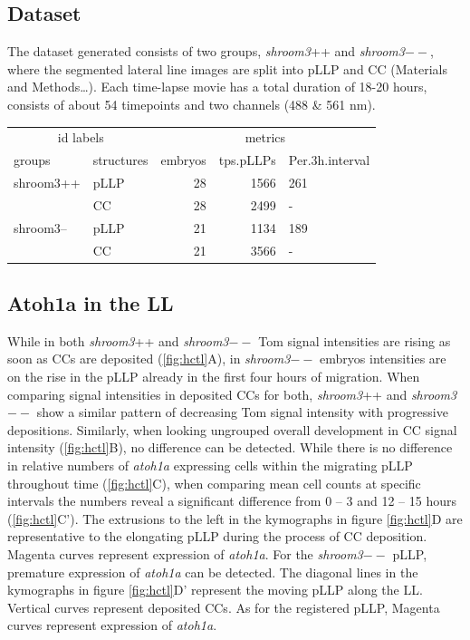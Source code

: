 \documentclass[11pt,singlespacinge,twoside]{reedthesis} %
\begin{document}
\hypertarget{dataset-4}{%
\subsection{Dataset}\label{dataset-4}}

The dataset generated consists of two groups, \emph{shroom3}++ and \emph{shroom3}\(--\), where the segmented lateral line images are split into pLLP and CC (Materials and Methods\ldots{}). Each time-lapse movie has a total duration of 18-20 hours, consists of about 54 timepoints and two channels (488 \& 561 nm).
\begin{tabular}{llrrl}
\toprule
\multicolumn{2}{c}{id labels} & \multicolumn{3}{c}{metrics} \\
\cmidrule(l{3pt}r{3pt}){1-2} \cmidrule(l{3pt}r{3pt}){3-5}
groups & structures & embryos & tps.pLLPs & Per.3h.interval\\
\midrule
shroom3++ & pLLP & 28 & 1566 & 261\\
 & CC & 28 & 2499 & -\\
shroom3-- & pLLP & 21 & 1134 & 189\\
 & CC & 21 & 3566 & -\\
\bottomrule
\end{tabular}
\hypertarget{atoh1a-in-the-ll}{%
\subsection{Atoh1a in the LL}\label{atoh1a-in-the-ll}}

While in both \emph{shroom3}++ and \emph{shroom3}\(--\) Tom signal intensities are rising as soon as CCs are deposited (\ref{fig:hctl}A), in \emph{shroom3}\(--\) embryos intensities are on the rise in the pLLP already in the first four hours of migration. When comparing signal intensities in deposited CCs for both, \emph{shroom3}++ and \emph{shroom3}\(--\) show a similar pattern of decreasing Tom signal intensity with progressive depositions. Similarly, when looking ungrouped overall development in CC signal intensity (\ref{fig:hctl}B), no difference can be detected.
While there is no difference in relative numbers of \emph{atoh1a} expressing cells within the migrating pLLP throughout time (\ref{fig:hctl}C), when comparing mean cell counts at specific intervals the numbers reveal a significant difference from 0 -- 3 and 12 -- 15 hours (\ref{fig:hctl}C'). The extrusions to the left in the kymographs in figure \ref{fig:hctl}D are representative to the elongating pLLP during the process of CC deposition. Magenta curves represent expression of \emph{atoh1a}. For the \emph{shroom3}\(--\) pLLP, premature expression of \emph{atoh1a} can be detected. The diagonal lines in the kymographs in figure \ref{fig:hctl}D' represent the moving pLLP along the LL. Vertical curves represent deposited CCs. As for the registered pLLP, Magenta curves represent expression of \emph{atoh1a}.
\end{document}
